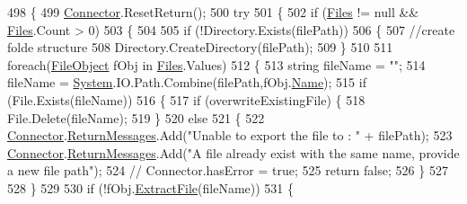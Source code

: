 \begin{DoxyCode}
498     \{
499         \mbox{\hyperlink{class_connector}{Connector}}.ResetReturn();
500         \textcolor{keywordflow}{try}
501         \{
502             \textcolor{keywordflow}{if} (\mbox{\hyperlink{class_document_object_afe6bcf5175607f91dde768491f23a0a4}{Files}} != null && \mbox{\hyperlink{class_document_object_afe6bcf5175607f91dde768491f23a0a4}{Files}}.Count > 0)
503             \{
504               
505                 \textcolor{keywordflow}{if} (!Directory.Exists(filePath))
506                 \{
507                     \textcolor{comment}{//create folde structure}
508                     Directory.CreateDirectory(filePath);
509                 \}
510                 
511                 \textcolor{keywordflow}{foreach}(\mbox{\hyperlink{class_file_object}{FileObject}} fObj \textcolor{keywordflow}{in} \mbox{\hyperlink{class_document_object_afe6bcf5175607f91dde768491f23a0a4}{Files}}.Values)
512                 \{
513                     \textcolor{keywordtype}{string} fileName = \textcolor{stringliteral}{""};
514                     fileName = \mbox{\hyperlink{namespace_system}{System}}.IO.Path.Combine(filePath,fObj.\mbox{\hyperlink{class_file_object_a9d47aff166393cb47490da2661576d62}{Name}});
515                     \textcolor{keywordflow}{if} (File.Exists(fileName))
516                     \{
517                         \textcolor{keywordflow}{if} (overwriteExistingFile) \{
518                             File.Delete(fileName);
519                         \}
520                         \textcolor{keywordflow}{else}
521                         \{
522                             \mbox{\hyperlink{class_connector}{Connector}}.\mbox{\hyperlink{class_connector_a1ed422674b344524fd77998dcf6a9ba6}{ReturnMessages}}.Add(\textcolor{stringliteral}{"Unable to export the file
       to : "} + filePath);
523                             \mbox{\hyperlink{class_connector}{Connector}}.\mbox{\hyperlink{class_connector_a1ed422674b344524fd77998dcf6a9ba6}{ReturnMessages}}.Add(\textcolor{stringliteral}{"A file already exist with
       the same name, provide a new file path"});
524                             \textcolor{comment}{// Connector.hasError = true;}
525                             \textcolor{keywordflow}{return} \textcolor{keyword}{false};
526                         \}
527                       
528                     \}
529 
530                     \textcolor{keywordflow}{if} (!fObj.\mbox{\hyperlink{class_file_object_ae21fac09c5ab2f9fac96a3f084cb9ddc}{ExtractFile}}(fileName))
531                     \{

\end{DoxyCode}
